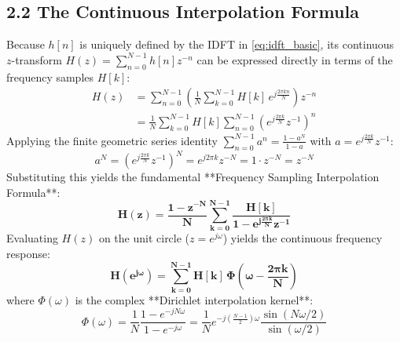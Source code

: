 \documentclass[11pt,a4paper]{article}
\begin{document}
\subsection{2.2 The Continuous Interpolation Formula}
Because $h[n]$ is uniquely defined by the IDFT in \eqref{eq:idft_basic}, its continuous $z$-transform $H(z) = \sum_{n=0}^{N-1} h[n] z^{-n}$ can be expressed directly in terms of the frequency samples $H[k]$:
\begin{align}
H(z) &= \sum_{n=0}^{N-1} \left( \frac{1}{N} \sum_{k=0}^{N-1} H[k] \, e^{j \frac{2\pi k n}{N}} \right) z^{-n} \nonumber \\
     &= \frac{1}{N} \sum_{k=0}^{N-1} H[k] \sum_{n=0}^{N-1} \left( e^{j \frac{2\pi k}{N}} z^{-1} \right)^n
\end{align}
Applying the finite geometric series identity $\sum_{n=0}^{N-1} a^n = \frac{1 - a^N}{1 - a}$ with $a = e^{j \frac{2\pi k}{N}} z^{-1}$:
\begin{equation}
a^N = \left( e^{j \frac{2\pi k}{N}} z^{-1} \right)^N = e^{j 2\pi k} z^{-N} = 1 \cdot z^{-N} = z^{-N}
\end{equation}
Substituting this yields the fundamental **Frequency Sampling Interpolation Formula**:
\begin{equation}
\mathbf{H(z) = \frac{1 - z^{-N}}{N} \sum_{k=0}^{N-1} \frac{H[k]}{1 - e^{j \frac{2\pi k}{N}} z^{-1}}}
\label{eq:interpolation_z}
\end{equation}
Evaluating $H(z)$ on the unit circle ($z = e^{j\omega}$) yields the continuous frequency response:
\begin{equation}
\mathbf{H(e^{j\omega}) = \sum_{k=0}^{N-1} H[k] \, \Phi\left( \omega - \frac{2\pi k}{N} \right)}
\label{eq:interpolation_freq}
\end{equation}
where $\Phi(\omega)$ is the complex **Dirichlet interpolation kernel**:
\begin{equation}
\Phi(\omega) = \frac{1}{N} \frac{1 - e^{-j N \omega}}{1 - e^{-j\omega}} = \frac{1}{N} e^{-j \left(\frac{N-1}{2}\right)\omega} \frac{\sin(N\omega/2)}{\sin(\omega/2)}
\label{eq:dirichlet_kernel}
\end{equation}
\end{document}
